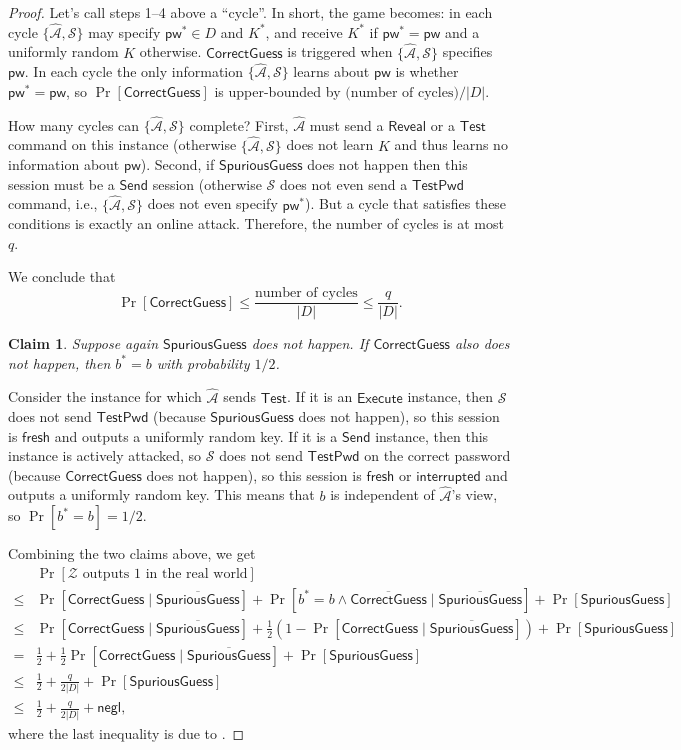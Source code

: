\documentclass{article}
\newtheorem{claim}{Claim}
\newcommand{\negl}{\mathsf{negl}}
\newcommand{\adv}{\mathcal{A}}
\newcommand{\env}{\mathcal{Z}}
\renewcommand{\sim}{\mathcal{S}}
\newcommand{\pw}{\mathsf{pw}}
\newcommand{\TestPwd}{\mathsf{TestPwd}}
\newcommand{\fresh}{\mathsf{fresh}}
\newcommand{\interrupted}{\mathsf{interrupted}}
\newcommand{\Execute}{\mathsf{Execute}}
\newcommand{\Send}{\mathsf{Send}}
\newcommand{\Reveal}{\mathsf{Reveal}}
\newcommand{\Test}{\mathsf{Test}}
\newcommand{\SpuriousGuess}{\mathsf{SpuriousGuess}}
\newcommand{\CorrectGuess}{\mathsf{CorrectGuess}}
\begin{document}
\begin{proof}
Let's call steps 1--4 above a ``cycle''. In short, the game becomes: in each cycle $\{\widehat{\adv}, \sim\}$ may specify $\pw^* \in D$ and $K^*$, and receive $K^*$ if $\pw^* = \pw$ and a uniformly random $K$ otherwise. $\CorrectGuess$ is triggered when $\{\widehat{\adv}, \sim\}$ specifies $\pw$. In each cycle the only information $\{\widehat{\adv}, \sim\}$ learns about $\pw$ is whether $\pw^* = \pw$, so $\Pr[\CorrectGuess]$ is upper-bounded by $\text{(number of cycles)}/|D|$.

How many cycles can $\{\widehat{\adv}, \sim\}$ complete? First, $\widehat{\adv}$ must send a $\Reveal$ or a $\Test$ command on this instance (otherwise $\{\widehat{\adv}, \sim\}$ does not learn $K$ and thus learns no information about $\pw$). Second, if $\SpuriousGuess$ does not happen then this session must be a $\Send$ session (otherwise $\sim$ does not even send a $\TestPwd$ command, i.e., $\{\widehat{\adv}, \sim\}$ does not even specify $\pw^*$). But a cycle that satisfies these conditions is exactly an online attack. Therefore, the number of cycles is at most $q$.

We conclude that
\[
\Pr[\CorrectGuess] \leq \frac{\text{number of cycles}}{|D|} \leq \frac{q}{|D|}.
\]
\begin{claim}
Suppose again $\SpuriousGuess$ does not happen. If $\CorrectGuess$ also does not happen, then $b^* = b$ with probability $1/2$.
\end{claim}
Consider the instance for which $\widehat{\adv}$ sends $\Test$. If it is an $\Execute$ instance, then $\sim$ does not send $\TestPwd$ (because $\SpuriousGuess$ does not happen), so this session is $\fresh$ and outputs a uniformly random key. If it is a $\Send$ instance, then this instance is actively attacked, so $\sim$ does not send $\TestPwd$ on the correct password (because $\CorrectGuess$ does not happen), so this session is $\fresh$ or $\interrupted$ and outputs a uniformly random key. This means that $b$ is independent of $\widehat{\adv}$'s view, so $\Pr[b^* = b] = 1/2$.

\medskip
Combining the two claims above, we get
\begin{align*}
&\Pr[\env\text{ outputs }1\text{ in the real world}] \\
\leq& \Pr[\CorrectGuess \mid \overline{\SpuriousGuess}] + \Pr[b^* = b \land \overline{\CorrectGuess} \mid \overline{\SpuriousGuess}] + \Pr[\SpuriousGuess] \\
\leq& \Pr[\CorrectGuess \mid \overline{\SpuriousGuess}] + \frac{1}{2}(1 - \Pr[\CorrectGuess \mid \overline{\SpuriousGuess}]) + \Pr[\SpuriousGuess] \\
=& \frac{1}{2} + \frac{1}{2}\Pr[\CorrectGuess \mid \overline{\SpuriousGuess}] + \Pr[\SpuriousGuess] \\
\leq& \frac{1}{2} + \frac{q}{2|D|} + \Pr[\SpuriousGuess] \\
\leq& \frac{1}{2} + \frac{q}{2|D|} + \negl,
\end{align*}
where the last inequality is due to .

\end{proof}
\end{document}
